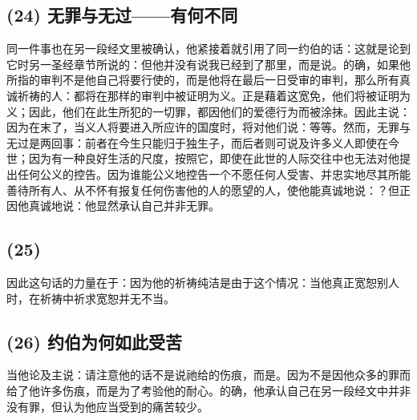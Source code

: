 
\subsection{(24) 无罪与无过——有何不同}

同一件事也在另一段经文里被确认，他紧接着就引用了同一约伯的话：这就是论到它时另一圣经章节所说的：但他并没有说我已经到了那里，而是说。的确，如果他所指的审判不是他自己将要行使的，而是他将在最后一日受审的审判，那么所有真诚祈祷的人：都将在那样的审判中被证明为义。正是藉着这宽免，他们将被证明为义；因此，他们在此生所犯的一切罪，都因他们的爱德行为而被涂抹。因此主说：因为在末了，当义人将要进入所应许的国度时，将对他们说：等等。然而，无罪与无过是两回事：前者在今生只能归于独生子，而后者则可说及许多义人即使在今世；因为有一种良好生活的尺度，按照它，即使在此世的人际交往中也无法对他提出任何公义的控告。因为谁能公义地控告一个不愿任何人受害、并忠实地尽其所能善待所有人、从不怀有报复任何伤害他的人的愿望的人，使他能真诚地说：？但正因他真诚地说：他显然承认自己并非无罪。\par


\subsection{(25)}

因此这句话的力量在于：因为他的祈祷纯洁是由于这个情况：当他真正宽恕别人时，在祈祷中祈求宽恕并无不当。\par


\subsection{(26) 约伯为何如此受苦}

当他论及主说：请注意他的话不是说祂给的伤痕，而是。因为不是因他众多的罪而给了他许多伤痕，而是为了考验他的耐心。的确，他承认自己在另一段经文中并非没有罪，但认为他应当受到的痛苦较少。\par

